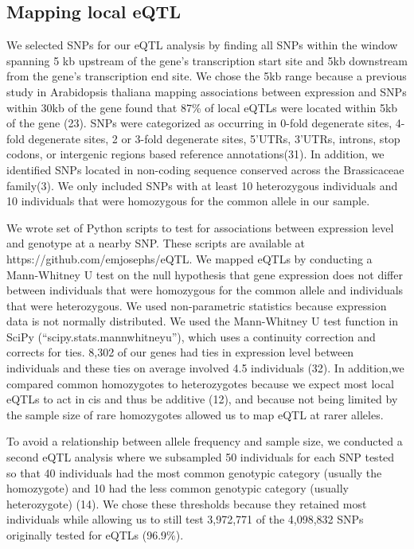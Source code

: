 \subsection{Mapping local eQTL}
We selected SNPs for our eQTL analysis by finding all SNPs within the window spanning 5 kb upstream of the gene’s transcription start site and 5kb downstream from the gene’s transcription end site. We chose the 5kb range because a previous study in Arabidopsis thaliana mapping associations between expression and SNPs within 30kb of the gene found that 87\% of local eQTLs were located within 5kb of the gene (23). SNPs were categorized as occurring in 0-fold degenerate sites, 4-fold degenerate sites, 2 or 3-fold degenerate sites, 5'UTRs, 3'UTRs, introns, stop codons, or intergenic regions based reference annotations(31). In addition, we identified SNPs located in non-coding sequence conserved across the Brassicaceae family(3). We only included SNPs with at least 10 heterozygous individuals and 10 individuals that were homozygous for the common allele in our sample.

We wrote set of Python scripts to test for associations between expression level and genotype at a nearby SNP. These scripts are available at https://github.com/emjosephs/eQTL. We mapped eQTLs by conducting a Mann-Whitney U test on the null hypothesis that gene expression does not differ between individuals that were homozygous for the common allele and individuals that were heterozygous. We used non-parametric statistics because expression data is not normally distributed. We used the Mann-Whitney U test function in SciPy (“scipy.stats.mannwhitneyu”), which uses a continuity correction and corrects for ties. 8,302 of our genes had ties in expression level between individuals and these ties on average involved 4.5 individuals (32). In addition,we compared common homozygotes to heterozygotes because we expect most local eQTLs to act in cis and thus be additive (12), and because not being limited by the sample size of rare homozygotes allowed us to map eQTL at rarer alleles. 

To avoid a relationship between allele frequency and sample size, we conducted a second eQTL analysis where we subsampled 50 individuals for each SNP tested so that 40 individuals had the most common genotypic category (usually the homozygote) and 10 had the less common genotypic category (usually heterozygote) (14). We chose these thresholds because they retained most individuals while allowing us to still test 3,972,771 of the 4,098,832 SNPs originally tested for eQTLs (96.9\%).

